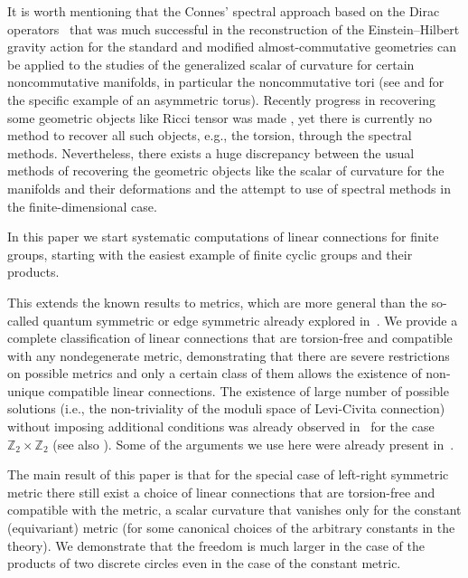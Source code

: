 \documentclass[pdftex]{sigma}
\numberwithin{equation}{section}
\begin{document}
It is worth mentioning that the Connes' spectral approach based on the Dirac operators~\cite{Connes:1994bk}
that was much successful in the reconstruction of the Einstein--Hilbert gravity action for the standard
and modified almost-commutative geometries \cite{CoMa:bk08} can be applied to the studies of the
generalized scalar of curvature for certain noncommutative manifolds, in particular the noncommutative
tori (see \cite{FK13,FK19} and \cite{DaSi15} for the specific example of an asymmetric torus).
 Recently progress in recovering some geometric objects like Ricci tensor was made
\cite{FGK19}, yet there is currently no method to recover all such objects, e.g.,
the torsion, through the spectral methods.
Nevertheless, there exists a huge discrepancy between the usual methods of recovering the
geometric objects like the scalar of curvature for the manifolds and their deformations and the
attempt to use of spectral methods \cite{Ba15,BG19,Gl17,PS} in the finite-dimensional case.

In this paper we start systematic computations of linear connections for finite groups, starting with the
easiest example of finite cyclic groups and their products.

This extends the known results to metrics, which are more general than the so-called quantum symmetric
or edge symmetric already explored in~\cite{majid2020,M13}. We provide a complete classification of linear
connections that are torsion-free and compatible with any nondegenerate metric, demonstrating that there are severe
restrictions on possible metrics and only a certain class of them allows the existence of non-unique compatible
linear connections. The existence of large number of possible solutions (i.e., the non-triviality of the moduli
space of Levi-Civita connection) without imposing additional conditions was already observed in~\cite{M1} for the
case $\mathbb{Z}_2\times\mathbb{Z}_2$ (see also \cite[Chapter~8.2]{BM_book}). Some of the arguments we use here
were already present in~\cite{M1,M2}.

The main result of this paper is that for the special case of left-right symmetric metric there still exist a choice
of linear connections that are torsion-free and compatible with the metric, a scalar curvature that vanishes
only for the constant (equivariant) metric (for some canonical choices of the arbitrary constants in the theory).
We demonstrate that the freedom is much larger in the case of the products of two discrete circles even in the
case of the constant metric.
\end{document}
